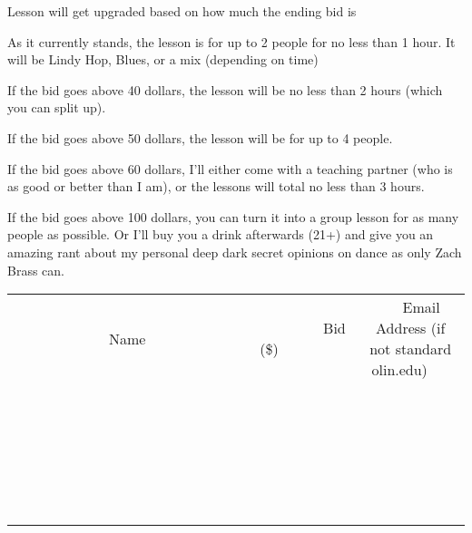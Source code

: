 \documentclass[11pt]{article}
\begin{document}
Lesson will get upgraded based on how much the ending bid is

As it currently stands, the lesson is for up to 2 people for no less than 1 hour. It will be Lindy Hop, Blues, or a mix (depending on time)

If the bid goes above 40 dollars, the lesson will be no less than 2 hours (which you can split up).

If the bid goes above 50 dollars, the lesson will be for up to 4 people.

If the bid goes above 60 dollars, I'll either come with a teaching partner (who is as good or better than I am), or the lessons will total no less than 3 hours.

If the bid goes above 100 dollars, you can turn it into a group lesson for as many people as possible. Or I'll buy you a drink afterwards (21+) and give you an amazing rant about my personal deep dark secret opinions on dance as only Zach Brass can.
\\[6ex]
\begin{tabular}{c c c}
~~~~~~~~~~~~~Name~~~~~~~~~~~~~ & ~~~~~~~~~Bid (\$)~~~~~~~~~  & ~~~Email Address (if not standard olin.edu)~~~\\
 & & \\
\hline
 & & \\
\hline
 & & \\
\hline
 & & \\
\hline
 & & \\
\hline
 & & \\
\hline
 & & \\
\hline
 & & \\
\hline
 & & \\
\hline
 & & \\
\hline
 & & \\
\hline
 & & \\
\hline
 & & \\
\hline
 & & \\
\hline
 & & \\
\hline
 & & \\
\hline
 & & \\
\hline
 & & \\
\hline
 & & \\
\hline
 & & \\
\hline
 & & \\
\hline
 & & \\
\hline
 & & \\
\hline
 & & \\
\hline
 & & \\
\hline
 & & \\
\hline
\end{tabular}
\newpage
\end{document}
